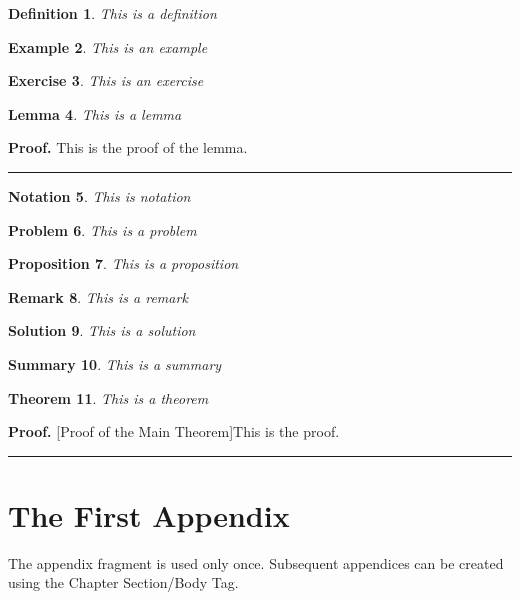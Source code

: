 \documentclass[11pt,spanish]{report}
\newtheorem{theorem}{Theorem}
\newtheorem{definition}[theorem]{Definition}
\newtheorem{example}[theorem]{Example}
\newtheorem{exercise}[theorem]{Exercise}
\newtheorem{lemma}[theorem]{Lemma}
\newtheorem{notation}[theorem]{Notation}
\newtheorem{problem}[theorem]{Problem}
\newtheorem{proposition}[theorem]{Proposition}
\newtheorem{remark}[theorem]{Remark}
\newtheorem{solution}[theorem]{Solution}
\newtheorem{summary}[theorem]{Summary}
\newenvironment{proof}[1][Proof]{\textbf{#1.} }{\ \rule{0.5em}{0.5em}}
\begin{document}
\begin{definition}
This is a definition
\end{definition}

\begin{example}
This is an example
\end{example}

\begin{exercise}
This is an exercise
\end{exercise}

\begin{lemma}
This is a lemma
\end{lemma}

\begin{proof}
This is the proof of the lemma.
\end{proof}

\begin{notation}
This is notation
\end{notation}

\begin{problem}
This is a problem
\end{problem}

\begin{proposition}
This is a proposition
\end{proposition}

\begin{remark}
This is a remark
\end{remark}

\begin{solution}
This is a solution
\end{solution}

\begin{summary}
This is a summary
\end{summary}

\begin{theorem}
This is a theorem
\end{theorem}

\begin{proof}
[Proof of the Main Theorem]This is the proof.
\end{proof}

\appendix 

\chapter{The First Appendix}

The appendix fragment is used only once. Subsequent appendices can be created
using the Chapter Section/Body Tag.



\end{document}

